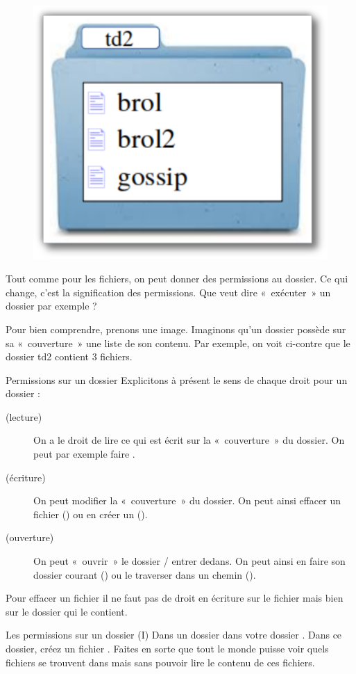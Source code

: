 \documentclass[a4paper,11pt]{style-esi/td}
\begin{document}
		\begin{figure}
			\vspace{-1em}
			\includegraphics[width=.2\textwidth]{image/perm-dossier.pdf}
			\vspace{-4em}
		\end{figure}
		Tout comme pour les fichiers, on peut donner des permissions au dossier. 
		Ce qui change, c'est la signification des permissions. 
		Que veut dire « exécuter » un dossier par exemple ? 
		
		Pour bien comprendre, prenons une image.
		Imaginons qu'un dossier possède sur sa « couverture » une liste de son contenu. 
		Par exemple, on voit ci-contre que le dossier td2 contient 3 fichiers.
		
		\begin{theorie}{Permissions sur un dossier}
			Explicitons à présent le sens de chaque droit pour un dossier :
			\begin{description}
			\item[ (lecture)] 
				On a le droit de lire ce qui est écrit sur la « couverture » du dossier. 
				On peut par exemple faire .
			\item[ (écriture)] 
				On peut modifier la « couverture » du dossier. 
				On peut ainsi effacer un fichier ()
				ou en créer un (). 
			\item[ (ouverture)]
				On peut « ouvrir » le dossier / entrer dedans. 
				On peut ainsi en faire son dossier courant () 
				ou le traverser dans un chemin ().				
			\end{description}
		\end{theorie}

		\begin{alertbox}
			Pour effacer un fichier 
			il ne faut pas de droit en écriture sur le fichier 
			mais bien sur le dossier qui le contient.
		\end{alertbox}
		
		\begin{Exercice}{Les permissions sur un dossier (I)}           
			Dans un dossier  dans votre dossier .
			Dans ce dossier, créez un fichier .
			Faites en sorte que tout le monde puisse voir 
			quels fichiers se trouvent dans 
			mais sans pouvoir lire le contenu de ces fichiers.
		\end{Exercice}
\end{document}

